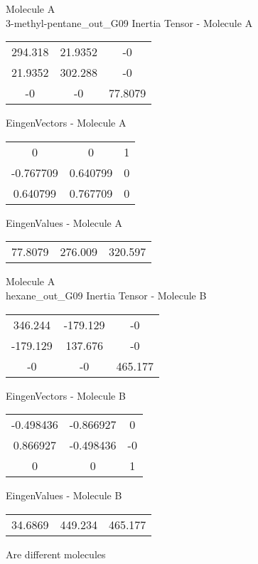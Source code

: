 \newpage
\begin{multicols}{2}
\begin{center}
Molecule A \\ 
3-methyl-pentane_out_G09
Inertia Tensor - Molecule A \\
\vtab
\begin{tabular}{|c c c|}
294.318	 & 	21.9352	 & 	-0	 \\
21.9352	 & 	302.288	 & 	-0	 \\
-0	 & 	-0	 & 	77.8079
\end{tabular}

\vtab
 EingenVectors - Molecule A     \\
\vtab
\begin{tabular}{|c c c|}
0	 & 	0	 & 	1	 \\
-0.767709	 & 	0.640799	 & 	0	 \\
0.640799	 & 	0.767709	 & 	0
\end{tabular}

\vtab
 EingenValues - Molecule A     \\
\vtab
\begin{tabular}{|c c c|}
77.8079	 & 	276.009	 & 	320.597
\end{tabular}
\columnbreak
Molecule A \\ 
hexane_out_G09
Inertia Tensor - Molecule B \\
\vtab
\begin{tabular}{|c c c|}
346.244	 & 	-179.129	 & 	-0	 \\
-179.129	 & 	137.676	 & 	-0	 \\
-0	 & 	-0	 & 	465.177
\end{tabular}

\vtab
 EingenVectors - Molecule B     \\
\vtab
\begin{tabular}{|c c c|}
-0.498436	 & 	-0.866927	 & 	0	 \\
0.866927	 & 	-0.498436	 & 	-0	 \\
0	 & 	0	 & 	1
\end{tabular}

\vtab
 EingenValues - Molecule B     \\
\vtab
\begin{tabular}{|c c c|}
34.6869	 & 	449.234	 & 	465.177
\end{tabular}
\textcolor{NavyBlue}{\large Are different molecules}
\end{center}
\end{multicols}
